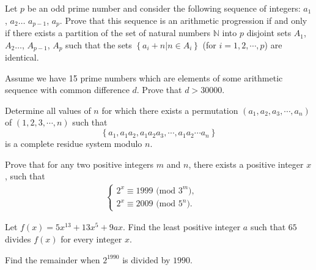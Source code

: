 \documentclass{subfile}
\begin{document}
	\begin{problem} %
		Let $p$ be an odd prime number and consider the following sequence of integers: $a_1$, $a_2\ldots$ $a_{p-1}$, $a_p$. Prove that this sequence is an arithmetic progression if and only if there exists a partition of the set of natural numbers $\mathbb{N}$ into $p$ disjoint sets $A_1$, $A_2\ldots$, $A_{p-1}$, $A_p$ such that the sets $\left\{ a_i+n|n\in A_i\right\}$ (for $i=1, 2,\cdots, p$) are identical.
	\end{problem}
	
	\begin{problem} %
		Assume we have 15 prime numbers which are elements of some arithmetic sequence with common difference $d$. Prove that $d>30000$.
	\end{problem}
	
	\begin{problem} %
		Determine all values of $n$ for which there exists a permutation $(a_1,a_2,a_3,\cdots,a_n)$ of $(1,2,3,\cdots,n)$ such that $$\left\{ {{a_1},{a_1}{a_2},{a_1}{a_2}{a_3},\cdots,{a_1}{a_2}\cdots{a_n}} \right\}$$ is a complete residue system modulo $n$.
	\end{problem}
	
	\begin{problem} %
		Prove that for any two positive integers $m$ and $n$, there exists a positive integer $x$, such that
		\begin{align*}
		\left\{\begin{matrix} 2^x \equiv 1999 \text{ (mod }3^m), & & \\ 2^x \equiv 2009 \text{ (mod }5^n). & & \end{matrix}\right.
		\end{align*}
	\end{problem}
	
	\begin{problem} %
		Let $f(x) = 5 x^{13} + 13 x^5 + 9ax$. Find the least positive integer $a$ such that $65$ divides $f(x)$ for every integer $x$.
	\end{problem}
	
	\begin{problem} %
		Find the remainder when $2^{1990}$ is divided by $1990$.
	\end{problem}
	
\end{document}
